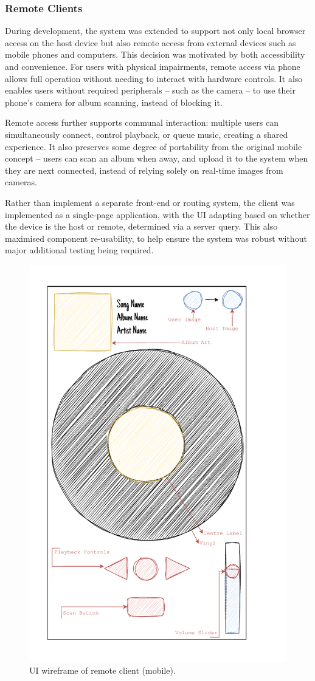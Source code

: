             \subsubsection{Remote Clients}
    
                During development, the system was extended to support not only local browser access on the host device but also remote access from external devices such as mobile phones and computers. This decision was motivated by both accessibility and convenience. For users with physical impairments, remote access via phone allows full operation without needing to interact with hardware controls. It also enables users without required peripherals -- such as the camera -- to use their phone's camera for album scanning, instead of blocking it.
    
                Remote access further supports communal interaction: multiple users can simultaneously connect, control playback, or queue music, creating a shared experience. It also preserves some degree of portability from the original mobile concept -- users can scan an album when away, and upload it to the system when they are next connected, instead of relying solely on real-time images from cameras.
                
                Rather than implement a separate front-end or routing system, the client was implemented as a single-page application, with the UI adapting based on whether the device is the host or remote, determined via a server query. This also maximised component re-usability, to help ensure the system was robust without major additional testing being required.
    
                \begin{figure}[h]
                    \centering
                    \includegraphics[width=0.55\linewidth]{images/SketchRemote.pdf}
                    \caption{UI wireframe of remote client (mobile).}
                    \label{fig:sketchRemote}
                \end{figure}
                
